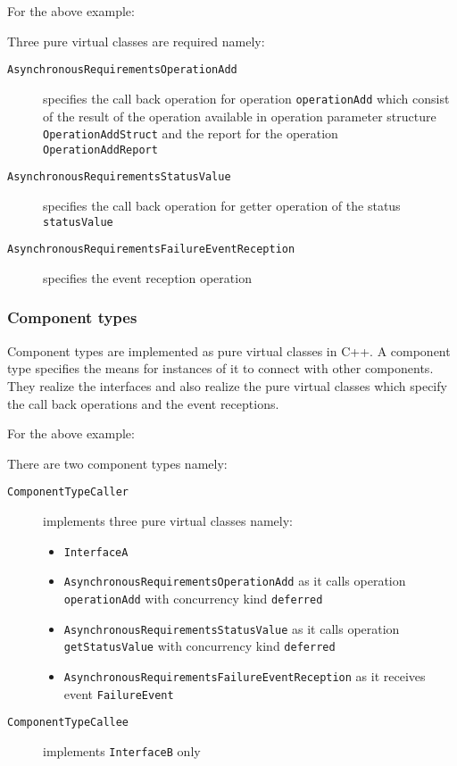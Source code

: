 For the above example:

Three pure virtual classes are required namely:
\begin{description}
\item [\texttt{AsynchronousRequirementsOperationAdd}] specifies the call back operation for operation \texttt{operationAdd} which consist of the result of the operation available in operation parameter structure \texttt{OperationAddStruct} and the report for the operation \texttt{OperationAddReport}
\item [\texttt{AsynchronousRequirementsStatusValue}] specifies the call back operation for getter operation of the status \texttt{statusValue}
\item [\texttt{AsynchronousRequirementsFailureEventReception}] specifies the event reception operation 
\end{description}

\subsubsection{Component types}
Component types are implemented as pure virtual classes in C++. A component type specifies the means for instances of it to connect with other components. They realize the interfaces and also realize the pure virtual classes which specify the call back operations and the event receptions.

For the above example:

There are two component types namely:
\begin{description}
\item [\texttt{ComponentType\textunderscore Caller}] implements three pure virtual classes namely:
\begin{itemize}
\item \texttt{InterfaceA}
\item \texttt{AsynchronousRequirementsOperationAdd} as it calls operation \texttt{operationAdd} with concurrency kind \texttt{deferred}
\item \texttt{AsynchronousRequirementsStatusValue} as it calls operation \texttt{getStatusValue} with concurrency kind \texttt{deferred}
\item \texttt{AsynchronousRequirementsFailureEventReception} as it receives event \texttt{FailureEvent}
\end{itemize}
\item [\texttt{ComponentType\textunderscore Callee}] implements \texttt{InterfaceB} only
\end{description}


